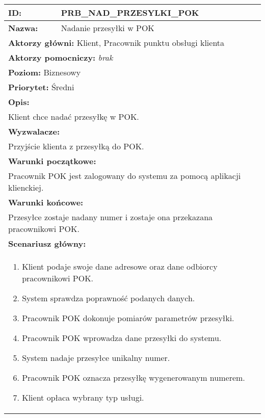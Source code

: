 \begin{center}
\begin{longtable}[h]{|p{1.6cm}|p{13.5cm}|}
\hline
\textbf{ID:} & PRB\_NAD\_PRZESYLKI\_POK \\ \hline
\textbf{Nazwa:} & Nadanie przesyłki w POK \\ \hline
\multicolumn{2}{|p{15.1cm}|}{\textbf{Aktorzy główni:}  Klient, Pracownik punktu obsługi klienta} \\
\multicolumn{2}{|p{15.1cm}|}{\textbf{Aktorzy pomocniczy:} \textit{brak}} \\
\multicolumn{2}{|p{15.1cm}|}{\textbf{Poziom:}  Biznesowy} \\
\multicolumn{2}{|p{15.1cm}|}{\textbf{Priorytet:}  Średni} \\
\hline
\multicolumn{2}{|p{15.1cm}|}{\textbf{Opis:}} \\
\multicolumn{2}{|p{15.1cm}|}{
Klient chce nadać przesyłkę w POK.
} \\ \hline
\multicolumn{2}{|p{15.1cm}|}{\textbf{Wyzwalacze:}} \\
\multicolumn{2}{|p{15.1cm}|}{
Przyjście klienta z przesyłką do POK.
} \\ \hline
\multicolumn{2}{|p{15.1cm}|}{\textbf{Warunki początkowe:}} \\
\multicolumn{2}{|p{15.1cm}|}{
Pracownik POK jest zalogowany do systemu za pomocą aplikacji klienckiej.
} \\ \hline
\multicolumn{2}{|p{15.1cm}|}{\textbf{Warunki końcowe:}} \\
\multicolumn{2}{|p{15.1cm}|}{
Przesyłce zostaje nadany numer i zostaje ona przekazana pracownikowi POK.
} \\ \hline
\multicolumn{2}{|p{15.1cm}|}{\textbf{Scenariusz główny:}} \\
\multicolumn{2}{|p{15.1cm}|}{
\begin{enumerate}
\item Klient podaje swoje dane adresowe oraz dane odbiorcy pracownikowi POK. \label{sce:kl_pod_dane_pok}
\item System sprawdza poprawność podanych danych.
\item Pracownik POK dokonuje pomiarów parametrów przesyłki.
\item Pracownik POK wprowadza dane przesyłki do systemu.
\item System nadaje przesyłce unikalny numer.
\item Pracownik POK oznacza przesyłkę wygenerowanym numerem.
\item Klient opłaca wybrany typ usługi.

\end{enumerate}}
\end{longtable}
\end{center}
